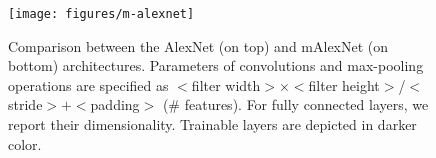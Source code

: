 \begin{figure}
    \texttt{[image: figures/m-alexnet]}
    \caption{Comparison between the AlexNet (on top) and mAlexNet (on bottom) architectures.
    Parameters of convolutions and max-pooling operations are specified as $<$filter width$>\times<$filter height$>$/$<$stride$>+<$padding$>$ (\# features).
    For fully connected layers, we report their dimensionality.
    Trainable layers are depicted in darker color.}
    \label{fig:mini:cnns}
\end{figure}




